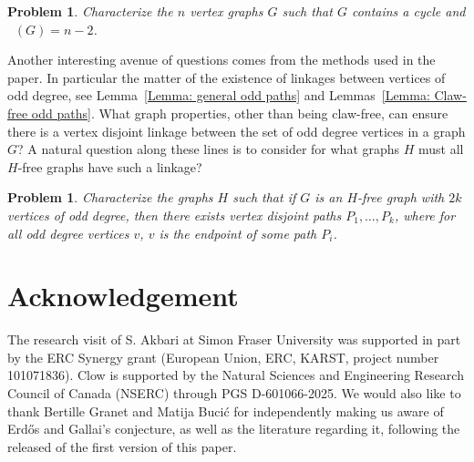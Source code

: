 \documentclass[11pt]{amsart}
\newtheorem{problem}[theorem]{Problem}
\theoremstyle{definition}
\DeclareMathOperator{\Cce}{g_{ce}}
\begin{document}
\begin{problem}
    Characterize the $n$ vertex graphs $G$ such that $G$ contains a cycle and $\Cce(G) = n-2$.
\end{problem}

Another interesting avenue
of questions comes from the methods used in the paper.
In particular the matter of the existence of linkages between vertices of odd degree,
see Lemma~\ref{Lemma: general odd paths} and Lemmas~\ref{Lemma: Claw-free odd paths}.
What graph properties, other than being claw-free, can ensure there is a vertex disjoint linkage between the set of odd degree vertices in a graph $G$?
A natural question along these lines is to consider for what graphs $H$ must all $H$-free graphs have such a linkage?

\begin{problem}
    Characterize the graphs $H$ such that if $G$ is an $H$-free graph with $2k$ vertices of odd degree, then there exists vertex disjoint paths $P_1,\dots, P_{k}$, where for all odd degree vertices $v$, $v$ is the endpoint of some path $P_i$.
\end{problem}


\section*{Acknowledgement}

The research visit of S. Akbari at Simon Fraser University was supported in part by the ERC Synergy grant 
(European Union, ERC, KARST, project number 101071836).
Clow is supported by the Natural Sciences and Engineering Research Council of Canada (NSERC) through PGS D-601066-2025.
We would also like to thank Bertille Granet and Matija Buci{\'c} for independently making us aware of Erd{\H{o}}s and Gallai's conjecture, as well as the literature regarding it,
following the released of the first version of this paper.



\end{document}
